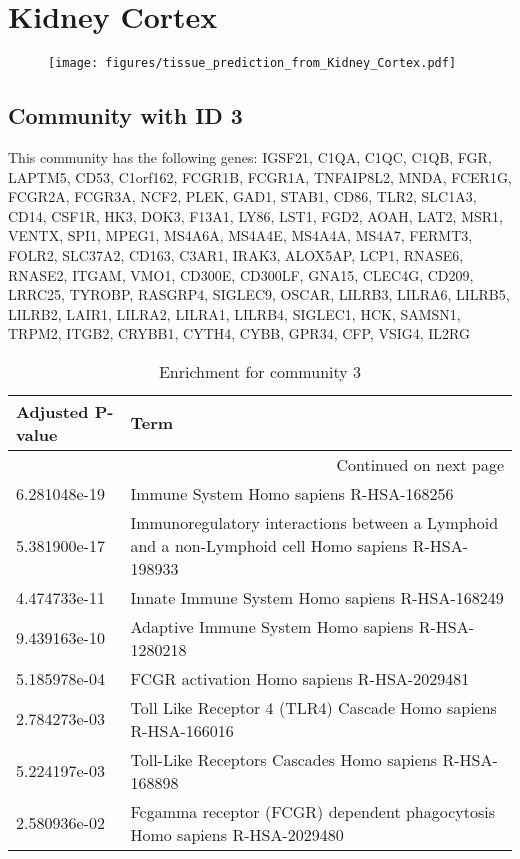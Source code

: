 
\section*{Kidney Cortex}
\begin{figure}[h!]
\centering
\texttt{[image: figures/tissue\_prediction\_from\_Kidney\_Cortex.pdf]}
\end{figure}



\subsection*{Community with ID 3}
This community has the following genes: IGSF21, C1QA, C1QC, C1QB, FGR, LAPTM5, CD53, C1orf162, FCGR1B, FCGR1A, TNFAIP8L2, MNDA, FCER1G, FCGR2A, FCGR3A, NCF2, PLEK, GAD1, STAB1, CD86, TLR2, SLC1A3, CD14, CSF1R, HK3, DOK3, F13A1, LY86, LST1, FGD2, AOAH, LAT2, MSR1, VENTX, SPI1, MPEG1, MS4A6A, MS4A4E, MS4A4A, MS4A7, FERMT3, FOLR2, SLC37A2, CD163, C3AR1, IRAK3, ALOX5AP, LCP1, RNASE6, RNASE2, ITGAM, VMO1, CD300E, CD300LF, GNA15, CLEC4G, CD209, LRRC25, TYROBP, RASGRP4, SIGLEC9, OSCAR, LILRB3, LILRA6, LILRB5, LILRB2, LAIR1, LILRA2, LILRA1, LILRB4, SIGLEC1, HCK, SAMSN1, TRPM2, ITGB2, CRYBB1, CYTH4, CYBB, GPR34, CFP, VSIG4, IL2RG
\\
\begin{longtable}{p{2.4cm}p{14.5cm}}
\caption{Enrichment for community 3}\\
\toprule
Adjusted \newline P-value &                                                                                                Term \\
\midrule
\endhead
\midrule
\multicolumn{2}{r}{{Continued on next page}} \\
\midrule
\endfoot

\bottomrule
\endlastfoot
             6.281048e-19 &                                                             Immune System Homo sapiens R-HSA-168256 \\
             5.381900e-17 &  Immunoregulatory interactions between a Lymphoid and a non-Lymphoid cell Homo sapiens R-HSA-198933 \\
             4.474733e-11 &                                                      Innate Immune System Homo sapiens R-HSA-168249 \\
             9.439163e-10 &                                                   Adaptive Immune System Homo sapiens R-HSA-1280218 \\
             5.185978e-04 &                                                          FCGR activation Homo sapiens R-HSA-2029481 \\
             2.784273e-03 &                                       Toll Like Receptor 4 (TLR4) Cascade Homo sapiens R-HSA-166016 \\
             5.224197e-03 &                                              Toll-Like Receptors Cascades Homo sapiens R-HSA-168898 \\
             2.580936e-02 &                           Fcgamma receptor (FCGR) dependent phagocytosis Homo sapiens R-HSA-2029480 \\
\end{longtable}


